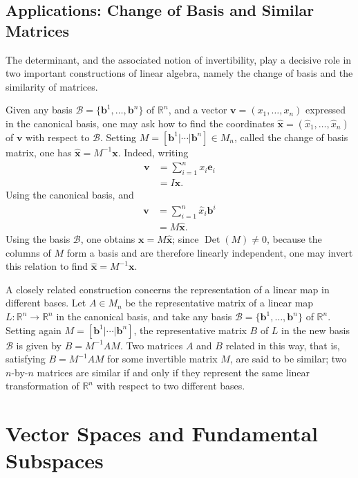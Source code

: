 \subsection{Applications: Change of Basis and Similar Matrices}

The determinant, and the associated notion of invertibility, play a decisive role in two important constructions of linear algebra, namely the change of basis and the similarity of matrices.

Given any basis $\mathcal{B} = \{\mathbf{b}^1, \dots, \mathbf{b}^n\}$ of $\mathbb{R}^n$, and a vector $\mathbf{v} = (x_1, \dots, x_n)$ expressed in the canonical basis, one may ask how to find the coordinates $\hat{\mathbf{x}} = (\hat{x}_1, \dots, \hat{x}_n)$ of $\mathbf{v}$ with respect to $\mathcal{B}$. Setting $M = [\mathbf{b}^1 | \cdots | \mathbf{b}^n] \in M_n$, called the change of basis matrix, one has $\hat{\mathbf{x}} = M^{-1} \mathbf{x}$. Indeed, writing
\[
\begin{aligned}
\mathbf{v} &= \sum_{i=1}^n x_i \mathbf{e}_i \\
&= I \mathbf{x}.
\end{aligned}
\]
Using the canonical basis, and
\[
\begin{aligned}
\mathbf{v} &= \sum_{i=1}^n \hat{x}_i \mathbf{b}^i \\
&= M \hat{\mathbf{x}}.
\end{aligned}
\]
Using the basis $\mathcal{B}$, one obtains $\mathbf{x} = M\hat{\mathbf{x}}$; since $\operatorname{Det}(M) \neq 0$, because the columns of $M$ form a basis and are therefore linearly independent, one may invert this relation to find $\hat{\mathbf{x}} = M^{-1}\mathbf{x}$.

A closely related construction concerns the representation of a linear map in different bases. Let $A \in M_n$ be the representative matrix of a linear map $L : \mathbb{R}^n \to \mathbb{R}^n$ in the canonical basis, and take any basis $\mathcal{B} = \{\mathbf{b}^1, \dots, \mathbf{b}^n\}$ of $\mathbb{R}^n$. Setting again $M = [\mathbf{b}^1 | \cdots | \mathbf{b}^n]$, the representative matrix $B$ of $L$ in the new basis $\mathcal{B}$ is given by $B = M^{-1} A M$. Two matrices $A$ and $B$ related in this way, that is, satisfying $B = M^{-1}AM$ for some invertible matrix $M$, are said to be similar; two $n$-by-$n$ matrices are similar if and only if they represent the same linear transformation of $\mathbb{R}^n$ with respect to two different bases.

\section{Vector Spaces and Fundamental Subspaces}

